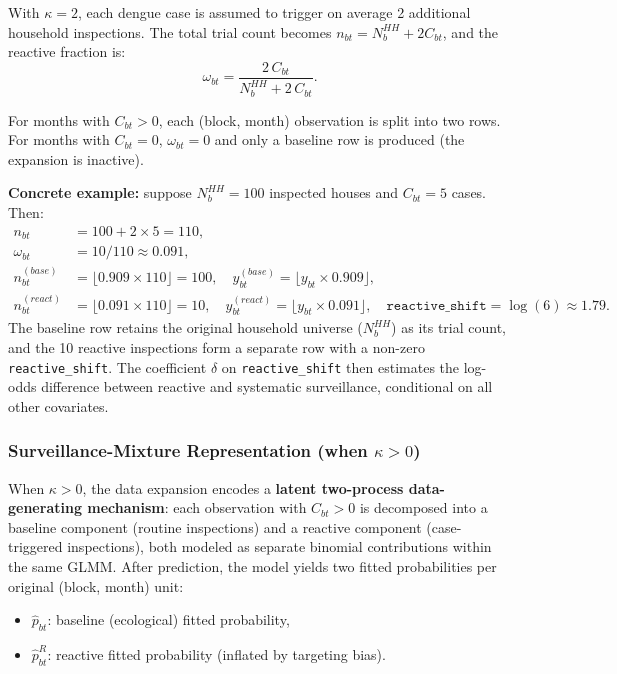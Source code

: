 \documentclass[12pt,a4paper]{article}
\begin{document}
With $\kappa = 2$, each dengue case is assumed to trigger on average 2 additional household inspections.
The total trial count becomes $n_{bt} = N_b^{HH} + 2C_{bt}$, and the reactive fraction is:
\begin{equation}
\omega_{bt} = \frac{2\,C_{bt}}{N_b^{HH} + 2\,C_{bt}}.
\end{equation}

For months with $C_{bt} > 0$, each (block, month) observation is split into two rows.
For months with $C_{bt} = 0$, $\omega_{bt} = 0$ and only a baseline row is produced (the expansion is inactive).

\noindent\textbf{Concrete example:} suppose $N_b^{HH} = 100$ inspected houses and $C_{bt} = 5$ cases. Then:
\begin{align*}
n_{bt} &= 100 + 2 \times 5 = 110, \\
\omega_{bt} &= 10/110 \approx 0.091, \\
n_{bt}^{(base)} &= \lfloor 0.909 \times 110 \rfloor = 100, \quad y_{bt}^{(base)} = \lfloor y_{bt} \times 0.909 \rfloor, \\
n_{bt}^{(react)} &= \lfloor 0.091 \times 110 \rfloor = 10, \quad y_{bt}^{(react)} = \lfloor y_{bt} \times 0.091 \rfloor, \quad \texttt{reactive\_shift} = \log(6) \approx 1.79.
\end{align*}
The baseline row retains the original household universe ($N_b^{HH}$) as its trial count, and the 10 reactive inspections form a separate row with a non-zero \texttt{reactive\_shift}.
The coefficient $\delta$ on \texttt{reactive\_shift} then estimates the log-odds difference between reactive and systematic surveillance, conditional on all other covariates.

\subsubsection{Surveillance-Mixture Representation (when $\kappa > 0$)}

When $\kappa > 0$, the data expansion encodes a \textbf{latent two-process data-generating mechanism}: each observation with $C_{bt} > 0$ is decomposed into a baseline component (routine inspections) and a reactive component (case-triggered inspections), both modeled as separate binomial contributions within the same GLMM.
After prediction, the model yields two fitted probabilities per original (block, month) unit:
\begin{itemize}
\item $\hat{p}_{bt}$: baseline (ecological) fitted probability,
\item $\hat{p}_{bt}^R$: reactive fitted probability (inflated by targeting bias).
\end{itemize}
\end{document}
